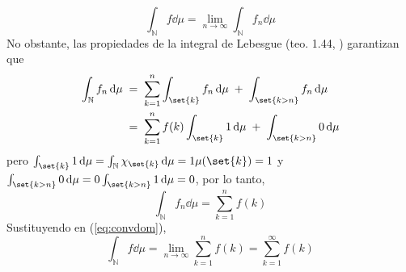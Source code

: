 \begin{sol}
\begin{equation}\label{eq:convdom}
\int_\mathbb{N}f\dd{\mu} = \lim_{n\to\infty} \int_\mathbb{N}f_n\dd{\mu}
\end{equation}
No obstante, las propiedades de la integral de Lebesgue (teo. 1.44, \cite{Salamon}) garantizan que
\begin{align*}
\int_\mathbb{N}f_n\dd{\mu}%
&\;=\; \sum^n_{k=1}\int_{\set{k}}f_n\dd{\mu} \;+\; \int_{\set{k>n}} f_n\dd{\mu}\\
&\;=\; \sum^n_{k=1}f(k)\int_{\set{k}}1\dd{\mu} \;+\; \int_{\set{k>n}} 0\dd{\mu}\\
\end{align*}
pero $\int_{\set{k}}1\dd{\mu} = \int_{\mathbb{N}}\chi_{\set{k}}\dd{\mu} = 1\mu(\set{k}) = 1$ y $\int_{\set{k>n}} 0\dd{\mu} = 0\int_{\set{k>n}} 1\dd{\mu} = 0$, por lo tanto, 
\[
\int_\mathbb{N}f_n\dd{\mu} = \sum^n_{k=1}f(k)
\] 
Sustituyendo en (\ref{eq:convdom}),
\[
\int_\mathbb{N}f\dd{\mu} = \lim_{n\to\infty}\sum^n_{k=1}f(k) = \sum^\infty_{k=1}f(k)
\]
\end{sol}